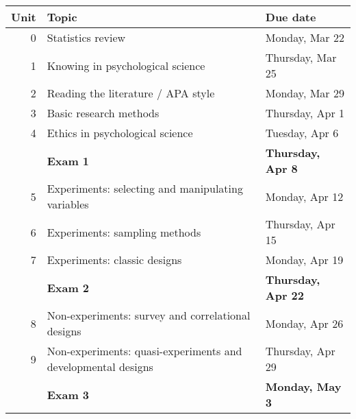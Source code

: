 \documentclass[10pt]{article}
\begin{document}
\begin{center}
\begin{tabular}{rll}
Unit & Topic & Due date\\
\hline
0 & Statistics review & Monday, Mar 22\\
1 & Knowing in psychological science & Thursday, Mar 25\\
2 & Reading the literature / APA style & Monday, Mar 29\\
3 & Basic research methods & Thursday, Apr 1\\
4 & Ethics in psychological science & Tuesday, Apr 6\\
 & \textbf{Exam 1} & \textbf{Thursday, Apr 8}\\
5 & Experiments: selecting and manipulating variables & Monday, Apr 12\\
6 & Experiments: sampling methods & Thursday, Apr 15\\
7 & Experiments: classic designs & Monday, Apr 19\\
 & \textbf{Exam 2} & \textbf{Thursday, Apr 22}\\
8 & Non-experiments: survey and correlational designs & Monday, Apr 26\\
9 & Non-experiments: quasi-experiments and developmental designs & Thursday, Apr 29\\
 & \textbf{Exam 3} & \textbf{Monday, May 3}\\
\end{tabular}
\end{center}
\end{document}
